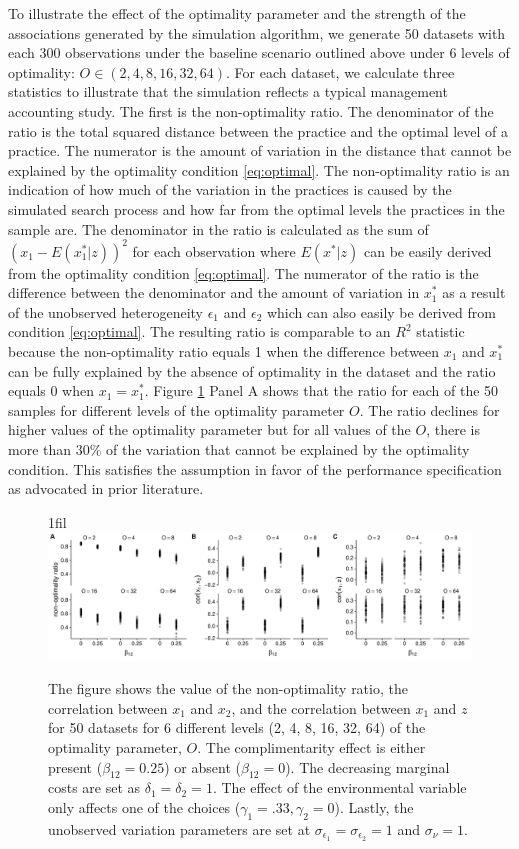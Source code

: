 \documentclass[12pt]{article}
\makeatletter
\newcommand*{\centerfloat}{%
  \parindent \z@
  \leftskip \z@ \@plus 1fil \@minus \textwidth
  \rightskip\leftskip
  \parfillskip \z@skip}
\makeatother
\begin{document}
To illustrate the effect of the optimality parameter and the strength of the associations generated by the simulation algorithm, we generate 50 datasets with each 300 observations under the baseline scenario outlined above under 6 levels of optimality: $O \in  (2, 4, 8, 16, 32, 64)$. For each dataset, we calculate three statistics to illustrate that the simulation reflects a typical management accounting study. The first is the non-optimality ratio. The denominator of the ratio is the total squared distance between the practice and the optimal level of a practice. The numerator is the amount of variation in the distance that cannot be explained by the optimality condition \ref{eq:optimal}. The non-optimality ratio is an indication of how much of the variation in the practices is caused by the simulated search process and how far from the optimal levels the practices in the sample are. The denominator in the ratio is calculated as the sum of $(x_1 - E(x_1^*|z))^2$ for each observation where $E(x^*|z)$ can be easily derived from the optimality condition \eqref{eq:optimal}. The numerator of the ratio is the difference between the denominator and the amount of variation in $x^*_1$ as a result of the unobserved heterogeneity $\epsilon_1$ and $\epsilon_2$ which can also easily be derived from condition \eqref{eq:optimal}. The resulting ratio is comparable to an $R^2$ statistic because the non-optimality ratio equals 1 when the difference between $x_1$ and $x^*_1$ can be fully explained by the absence of optimality in the dataset and the ratio equals 0 when $x_1 = x^*_1$. Figure \ref{calibration} Panel A shows that the ratio for each of the 50 samples for different levels of the optimality parameter $O$. The ratio declines for higher values of the optimality parameter but for all values of the $O$, there is more than $30\%$ of the variation that cannot be explained by the optimality condition. This satisfies the assumption in favor of the performance specification as advocated in prior literature.

\begin{figure}
\centerfloat
\includegraphics[width=450px]{figure-latex/sample_descriptives.pdf}
\caption[Calibration of Simulated Datasets]{\label{calibration} The figure shows the value of the non-optimality ratio, the correlation between $x_1$ and $x_2$, and the correlation between $x_1$ and $z$ for 50 datasets for 6 different levels (2, 4, 8, 16, 32, 64) of the optimality parameter, $O$. The complimentarity effect is either present ($\beta_{12} = 0.25$) or absent ($\beta_{12} = 0$). The decreasing marginal costs are set as $\delta_1 = \delta_2 = 1$. The effect of the environmental variable only affects one of the choices
($\gamma_1 = .33, \gamma_2 = 0$). Lastly, the unobserved variation parameters are set at $\sigma_{\epsilon_1} = \sigma_{\epsilon_2} = 1$ and $\sigma_{\nu} = 1.$}
\end{figure}
\end{document}
